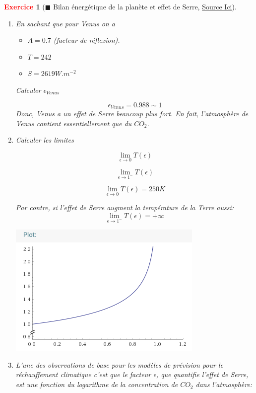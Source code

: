 \documentclass[11pt]{article}
\theoremstyle{mythmstyle}
\newtheorem{exo}{\textcolor{red}{\textbf{Exercice}}}
\begin{document}
\begin{exo}[$\blacksquare$ Bilan énergétique de la planète et effet de Serre, \href{http://step.ipgp.fr/images/e/ec/Bernard_geodynext_td1_corr.pdf}{Source Ici}]
\begin{enumerate}
\item En sachant que pour Venus on a
\begin{itemize}
    \item $A=0.7$ (facteur de réflexion).
    \item $T= 242$
    \item $S= 2619 W.m^{-2}$
\end{itemize}

\noindent Calculer $\epsilon_{Venus}$

\begin{solution}
$$
\epsilon_{Venus}= 0.988 \sim 1
$$
Donc, Venus a un effet de Serre beaucoup plus fort. En fait, l'atmosphère de Venus contient essentiellement que du $CO_2$.
\end{solution}

\item Calculer les limites

$$\lim_{\epsilon\to 0} T(\epsilon)$$

$$\lim_{\epsilon\to 1^{-}} T(\epsilon)$$

\begin{solution}
$$\lim_{\epsilon\to 0} T(\epsilon)= 250 K$$

Par contre, si l'effet de Serre augment la température de la Terre aussi:
$$\lim_{\epsilon\to 1^{-}} T(\epsilon)= +\infty $$

\begin{center}
\includegraphics[scale=0.5]{serre.png}
\end{center}

\end{solution}

\item L'une des observations de base pour les modèles de prévision pour le réchauffement climatique c'est que le facteur $\epsilon$, que quantifie l'effet de Serre, est une fonction du logarithme de la concentration de $CO_2$ dans l'atmosphère:


\end{enumerate}
\end{exo}
\end{document}
